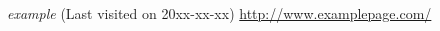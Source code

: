 
\begin{thebibliography}{X}


 \textit{example} 
(Last visited on 20xx-xx-xx) \url{http://www.examplepage.com/}



\end{thebibliography}
